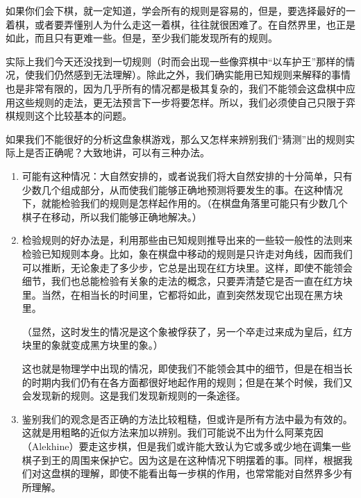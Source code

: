 如果你们会下棋，就一定知道，学会所有的规则是容易的，但是，要选择最好的一着棋，或者要弄懂别人为什么走这一着棋，往往就很困难了。在自然界里，也正是如此，而且只有更难一些。但是，至少我们能发现所有的规则。

实际上我们今天还没找到一切规则（时而会出现一些像弈棋中“以车护王”那样的情况，使我们仍然感到无法理解）。除此之外，我们确实能用已知规则来解释的事情也是非常有限的，因为几乎所有的情况都是极其复杂的，我们不能领会这盘棋中应用这些规则的走法，更无法预言下一步将要怎样。所以，我们必须使自己只限于弈棋规则这个比较基本的问题。


 如果我们不能很好的分析这盘象棋游戏，那么又怎样来辨别我们“猜测”出的规则实际上是否正确呢？大致地讲，可以有三种办法。

\begin{enumerate}
  \item[第一，]可能有这种情况：大自然安排的，或者说我们将大自然安排的十分简单，只有少数几个组成部分，从而使我们能够正确地预测将要发生的事。在这种情况下，就能检验我们的规则是怎样起作用的。（在棋盘角落里可能只有少数几个棋子在移动，所以我们能够正确地解决。）

  \item[第二种]检验规则的好办法是，利用那些由已知规则推导出来的一些较一般性的法则来检验已知规则本身。比如，象在棋盘中移动的规则是只许走对角线，因而我们可以推断，无论象走了多少步，它总是出现在红方块里。这样，即使不能领会细节，我们也总能检验有关象的走法的概念，只要弄清楚它是否一直在红方块里。当然，在相当长的时间里，它都将如此，直到突然发现它出现在黑方块里。

（显然，这时发生的情况是这个象被俘获了，另一个卒走过来成为皇后，红方块里的象就变成黑方块里的象。）

这也就是物理学中出现的情况，即使我们不能领会其中的细节，但是在相当长的时期内我们仍有在各方面都很好地起作用的规则；但是在某个时候，我们又会发现新的规则。这是我们发现新规则的一条途径。

  \item[第三个]鉴别我们的观念是否正确的方法比较粗糙，但或许是所有方法中最为有效的。这就是用粗略的近似方法来加以辨别。我们可能说不出为什么阿莱克因（Alekhine）要走这步棋，但是我们或许能大致认为它或多或少地在调集一些棋子到王的周围来保护它。因为这是在这种情况下明摆着的事。同样，根据我们对这盘棋的理解，即使不能看出每一步棋的作用，也常常能对自然界多少有所理解。

\end{enumerate}


